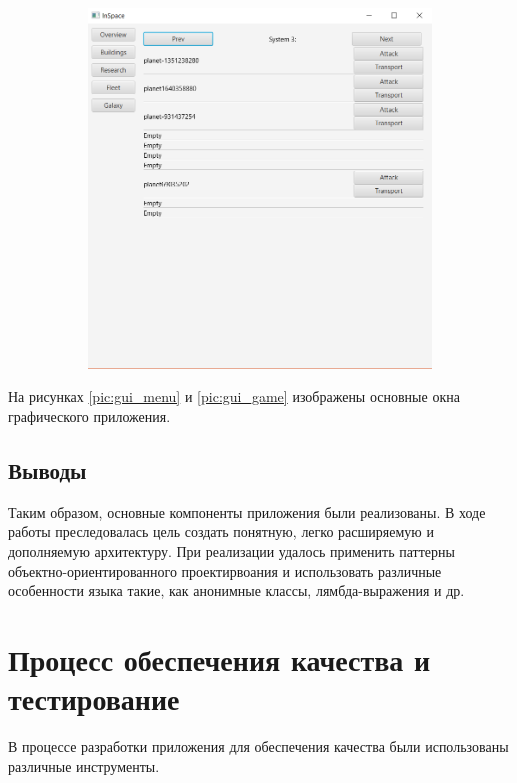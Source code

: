 \begin{figure}[H]
\begin{subfigure}[b]{0.3\textwidth}
\end{subfigure}
\begin{subfigure}[b]{0.3\textwidth} 
\includegraphics[width=1\textwidth]{../screenshots/5.png}
\end{subfigure}
\end{figure} 

На рисунках \ref{pic:gui_menu} и \ref{pic:gui_game} изображены основные окна графического приложения.   

\subsection{Выводы}
Таким образом, основные компоненты приложения были реализованы. В ходе работы преследовалась цель создать понятную, легко расширяемую и дополняемую архитектуру. При реализации удалось применить паттерны объектно-ориентированного проектирвоания и использовать различные особенности языка такие, как анонимные классы, лямбда-выражения и др. 
   
\section{Процесс обеспечения качества и тестирование}

В процессе разработки приложения для обеспечения качества были использованы различные инструменты.

